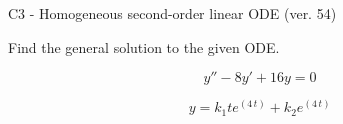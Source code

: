 \begin{exercise}
  \begin{exerciseTitle}C3 - Homogeneous second-order linear ODE (ver. 54)\end{exerciseTitle}
  \begin{exerciseStatement}
    
Find the general solution to the given ODE.

    
\[y''-8y'+16y = 0\]

  \end{exerciseStatement}
  \begin{exerciseAnswer}
    
\[y= k_{1} t e^{\left(4 \, t\right)} + k_{2} e^{\left(4 \, t\right)}\]

  \end{exerciseAnswer}
\end{exercise}